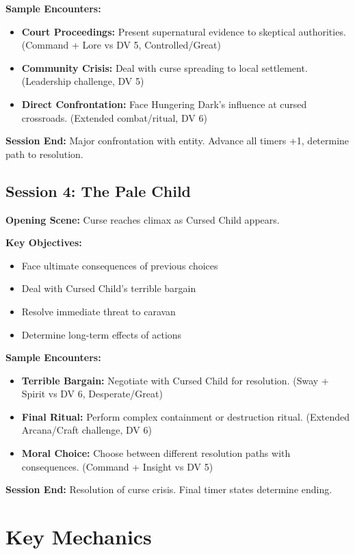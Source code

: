\documentclass[11pt]{article}
\begin{document}
\textbf{Sample Encounters:}
\begin{itemize}
\item \textbf{Court Proceedings:} Present supernatural evidence to skeptical authorities. (Command + Lore vs DV 5, Controlled/Great)
\item \textbf{Community Crisis:} Deal with curse spreading to local settlement. (Leadership challenge, DV 5)
\item \textbf{Direct Confrontation:} Face Hungering Dark's influence at cursed crossroads. (Extended combat/ritual, DV 6)
\end{itemize}

\textbf{Session End:} Major confrontation with entity. Advance all timers +1, determine path to resolution.

\subsection{Session 4: The Pale Child}

\textbf{Opening Scene:} Curse reaches climax as Cursed Child appears.

\textbf{Key Objectives:}
\begin{itemize}
\item Face ultimate consequences of previous choices
\item Deal with Cursed Child's terrible bargain
\item Resolve immediate threat to caravan
\item Determine long-term effects of actions
\end{itemize}

\textbf{Sample Encounters:}
\begin{itemize}
\item \textbf{Terrible Bargain:} Negotiate with Cursed Child for resolution. (Sway + Spirit vs DV 6, Desperate/Great)
\item \textbf{Final Ritual:} Perform complex containment or destruction ritual. (Extended Arcana/Craft challenge, DV 6)
\item \textbf{Moral Choice:} Choose between different resolution paths with consequences. (Command + Insight vs DV 5)
\end{itemize}

\textbf{Session End:} Resolution of curse crisis. Final timer states determine ending.

\section{Key Mechanics}
\end{document}
